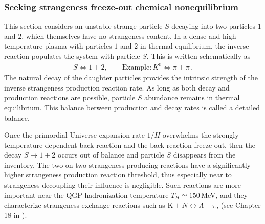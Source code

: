 

\subsubsection{Seeking strangeness freeze-out chemical nonequilibrium
}


This section considers an unstable strange particle $S$ decaying into two particles $1$ and $2$, which themselves have no strangeness content. In a dense and high-temperature plasma with particles $1$ and $2$ in thermal equilibrium, the inverse reaction populates the system with particle $S$. This is written schematically as
\begin{align}
 S\Longleftrightarrow1+2,\qquad \mathrm{Example}: K^0\Longleftrightarrow\pi+\pi\,.
\end{align}
The natural decay of the daughter particles provides the intrinsic strength of the inverse strangeness production reaction rate. As long as both decay and production reactions are possible, particle $S$ abundance remains in thermal equilibrium. This balance between production and decay rates is called a detailed balance.

Once the primordial Universe expansion rate $1/H$ overwhelms the strongly temperature dependent back-reaction and the back reaction freeze-out, then the decay $S\rightarrow 1+2$ occurs out of balance and particle $S$ disappears from the inventory. The two-on-two strangeness producing reactions have a significantly higher strangeness production reaction threshold, thus especially near to strangeness decoupling their influence is negligible. Such reactions are more important near the QGP hadronization temperature $T_H\simeq 150$\,MeV, and they characterize strangeness exchange reactions such as $\mathrm{K}+N\leftrightarrow \Lambda+\pi$, (see Chapter 18 in \cite{Letessier:2002ony}).


